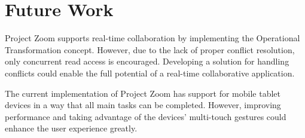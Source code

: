 \section{Future Work}
Project Zoom supports real-time collaboration by implementing the Operational Transformation concept. However, due to the lack of proper conflict resolution, only concurrent read access is encouraged. Developing a solution for handling conflicts could enable the full potential of a real-time collaborative application.

The current implementation of Project Zoom has support for mobile tablet devices in a way that all main tasks can be completed. However, improving performance and taking advantage of the devices' multi-touch gestures could enhance the user experience greatly.

